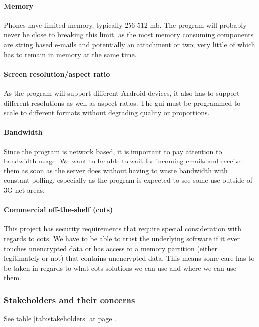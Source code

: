 \paragraph{Memory}\hfill
\newline
Phones have limited memory, typically 256-512 \gls{mb}. The program will probably never be close to breaking this limit, as the most memory consuming components are string based e-mails and potentially an attachment or two; very little of which has to remain in memory at the same time.

\paragraph{Screen resolution/aspect ratio} \hfill
\newline
As the program will support different Android devices, it also has to support different resolutions as well as aspect ratios. The \gls{gui} must be programmed to scale to different formats without degrading quality or proportions.

\paragraph{Bandwidth} \hfill
\newline
Since the program is network based, it is important to pay attention to bandwidth usage. We want to be able to wait for incoming emails and receive them as soon as the server does without having to waste bandwidth with constant polling, especially as the program is expected to see some use outside of 3G net areas.

\paragraph{Commercial off-the-shelf (\gls{cots})} \hfill
\newline
This project has security requirements that require special consideration with regards to \gls{cots}. We have to be able to trust the underlying software if it ever touches unencrypted data or has access to a memory partition (either legitimately or not) that contains unencrypted data. This means some care has to be taken in regards to what \gls{cots} solutions we can use and where we can use them. 

\subsubsection{Stakeholders and their concerns}
See table \ref{tab:stakeholders} at page \pageref{tab:stakeholders}.

